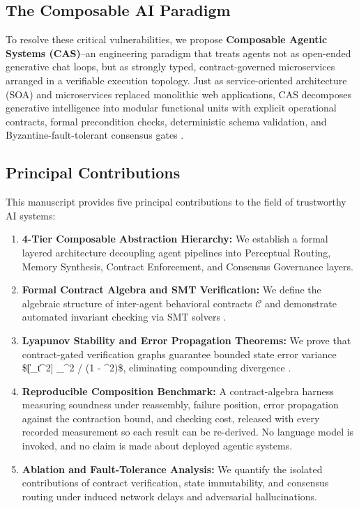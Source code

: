 \documentclass[10pt,twocolumn,letterpaper]{article}
\begin{document}
\subsection{The Composable AI Paradigm}


To resolve these critical vulnerabilities, we propose \textbf{Composable Agentic Systems (CAS)}--an engineering paradigm that treats agents not as open-ended generative chat loops, but as strongly typed, contract-governed microservices arranged in a verifiable execution topology. Just as service-oriented architecture (SOA) and microservices replaced monolithic web applications, CAS decomposes generative intelligence into modular functional units with explicit operational contracts, formal precondition checks, deterministic schema validation, and Byzantine-fault-tolerant consensus gates \cite{crossref_10_1109_access_2026_3656309,crossref_10_1145_3689096_3689462}.


\subsection{Principal Contributions}


This manuscript provides five principal contributions to the field of trustworthy AI systems:
\begin{enumerate}
  \item \textbf{4-Tier Composable Abstraction Hierarchy:} We establish a formal layered architecture decoupling agent pipelines into Perceptual Routing, Memory Synthesis, Contract Enforcement, and Consensus Governance layers.
  \item \textbf{Formal Contract Algebra and SMT Verification:} We define the algebraic structure of inter-agent behavioral contracts $\mathcal{C}$ and demonstrate automated invariant checking via SMT solvers \cite{arxiv_2404_01131}.
  \item \textbf{Lyapunov Stability and Error Propagation Theorems:} We prove that contract-gated verification graphs guarantee bounded state error variance \$[\|\_t\|^2] \le \sigma\_{\max}^2 / (1 - \rho^2)\$, eliminating compounding divergence \cite{arxiv_2501_02497}.
  \item \textbf{Reproducible Composition Benchmark:} A contract-algebra harness measuring soundness under reassembly, failure position, error propagation against the contraction bound, and checking cost, released with every recorded measurement so each result can be re-derived. No language model is invoked, and no claim is made about deployed agentic systems.
  \item \textbf{Ablation and Fault-Tolerance Analysis:} We quantify the isolated contributions of contract verification, state immutability, and consensus routing under induced network delays and adversarial hallucinations.
\end{enumerate}
\end{document}
